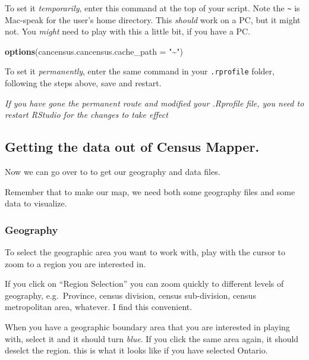\documentclass[
]{article}
\newenvironment{Shaded}{\begin{snugshade}}{\end{snugshade}}
\newcommand{\DataTypeTok}[1]{\textcolor[rgb]{0.13,0.29,0.53}{#1}}
\newcommand{\KeywordTok}[1]{\textcolor[rgb]{0.13,0.29,0.53}{\textbf{#1}}}
\newcommand{\NormalTok}[1]{#1}
\newcommand{\StringTok}[1]{\textcolor[rgb]{0.31,0.60,0.02}{#1}}
\begin{document}
To set it \emph{temporarily}, enter this command at the top of your
script. Note the \texttt{\textasciitilde{}} is Mac-speak for the user's
home directory. This \emph{should} work on a PC, but it might not. You
\emph{might} need to play with this a little bit, if you have a PC.

\begin{Shaded}
\begin{Highlighting}[]
\KeywordTok{options}\NormalTok{(}\DataTypeTok{cancensus.cancensus.cache\_path =} \StringTok{"\textasciitilde{}"}\NormalTok{)}
\end{Highlighting}
\end{Shaded}

To set it \emph{permanently}, enter the same command in your
\texttt{.rprofile} folder, following the steps above, save and restart.

\emph{If you have gone the permanent route and modified your .Rprofile
file, you need to restart RStudio for the changes to take effect}

\hypertarget{getting-the-data-out-of-census-mapper.}{%
\subsection{Getting the data out of Census
Mapper.}\label{getting-the-data-out-of-census-mapper.}}

Now we can go over to \href{http://censusmapper.ca}{} to get our
geography and data files.

Remember that to make our map, we need both some geography files and
some data to visualize.

\hypertarget{geography}{%
\subsubsection{Geography}\label{geography}}

To select the geographic area you want to work with, play with the
cursor to zoom to a region you are interested in.

If you click on ``Region Selection'' you can zoom quickly to different
levels of geography, e.g.~Province, census division, census
sub-division, census metropolitan area, whatever. I find this
convenient.

When you have a geographic boundary area that you are interested in
playing with, select it and it should turn \emph{blue}. If you click the
same area again, it should deselct the region. this is what it looks
like if you have selected Ontario.
\end{document}
